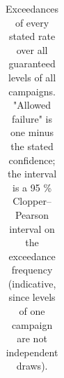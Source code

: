 \documentclass{iopjournal}
\begin{document}
{\renewcommand{\thetable}{S5.1}\small
\begin{longtable}[]{@{}
  >{\raggedright\arraybackslash}p{}
  >{\raggedright\arraybackslash}p{}
  >{\raggedright\arraybackslash}p{}
  >{\raggedright\arraybackslash}p{}
  >{\raggedright\arraybackslash}p{}
  >{\raggedright\arraybackslash}p{}
  >{\raggedright\arraybackslash}p{}
  >{\raggedright\arraybackslash}p{}
  >{\raggedright\arraybackslash}p{}@{}}
\caption{Exceedances of every stated rate over all guaranteed levels of all campaigns. "Allowed failure" is one minus the stated confidence; the interval is a 95 \% Clopper--Pearson interval on the exceedance frequency (indicative, since levels of one campaign are not independent draws).}\label{tab:S5.1}\\


\end{longtable}}
\end{document}
